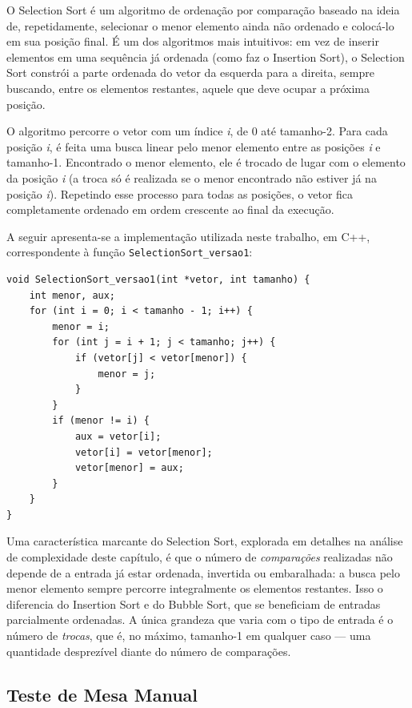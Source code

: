 \qquad O Selection Sort é um algoritmo de ordenação por comparação baseado
na ideia de, repetidamente, selecionar o menor elemento ainda não
ordenado e colocá-lo em sua posição final. É um dos algoritmos mais
intuitivos: em vez de inserir elementos em uma sequência já ordenada
(como faz o Insertion Sort), o Selection Sort constrói a parte
ordenada do vetor da esquerda para a direita, sempre buscando, entre
os elementos restantes, aquele que deve ocupar a próxima posição.

\qquad O algoritmo percorre o vetor com um índice \textit{i}, de 0 até
tamanho-2. Para cada posição \textit{i}, é feita uma busca linear pelo
menor elemento entre as posições \textit{i} e tamanho-1. Encontrado o
menor elemento, ele é trocado de lugar com o elemento da posição
\textit{i} (a troca só é realizada se o menor encontrado não estiver
já na posição \textit{i}). Repetindo esse processo para todas as
posições, o vetor fica completamente ordenado em ordem crescente ao
final da execução.

\qquad A seguir apresenta-se a implementação utilizada neste trabalho, em
C++, correspondente à função \texttt{SelectionSort\_versao1}:

\begin{verbatim}
void SelectionSort_versao1(int *vetor, int tamanho) {
    int menor, aux;
    for (int i = 0; i < tamanho - 1; i++) {
        menor = i;
        for (int j = i + 1; j < tamanho; j++) {
            if (vetor[j] < vetor[menor]) {
                menor = j;
            }
        }
        if (menor != i) {
            aux = vetor[i];
            vetor[i] = vetor[menor];
            vetor[menor] = aux;
        }
    }
}
\end{verbatim}

\qquad Uma característica marcante do Selection Sort, explorada em detalhes
na análise de complexidade deste capítulo, é que o número de
\textit{comparações} realizadas não depende de a entrada já estar
ordenada, invertida ou embaralhada: a busca pelo menor elemento
sempre percorre integralmente os elementos restantes. Isso o
diferencia do Insertion Sort e do Bubble Sort, que se beneficiam de
entradas parcialmente ordenadas. A única grandeza que varia com o
tipo de entrada é o número de \textit{trocas}, que é, no máximo,
tamanho-1 em qualquer caso — uma quantidade desprezível diante do
número de comparações.

\subsection{Teste de Mesa Manual}


